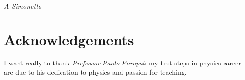 \vspace*{4cm}
\begin{flushright}
{\itshape A Simonetta
}
\end{flushright}



\chapter*{Acknowledgements}

I want really to thank {\it Professor Paolo Poropat}: my first steps in
physics career are due to his dedication to physics and passion for teaching.
